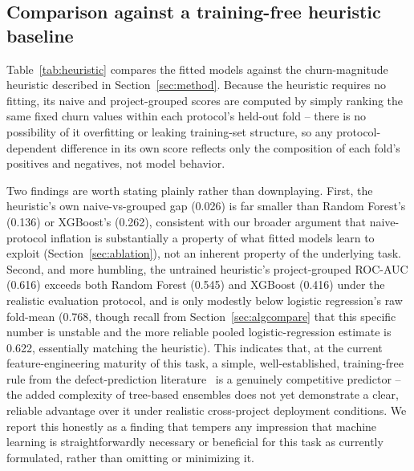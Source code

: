 \documentclass[preprint,12pt]{elsarticle}
\begin{document}
\subsection{Comparison against a training-free heuristic baseline}
\label{sec:heuristic}
Table~\ref{tab:heuristic} compares the fitted models against the churn-magnitude heuristic described in Section~\ref{sec:method}. Because the heuristic requires no fitting, its naive and project-grouped scores are computed by simply ranking the same fixed churn values within each protocol's held-out fold -- there is no possibility of it overfitting or leaking training-set structure, so any protocol-dependent difference in its own score reflects only the composition of each fold's positives and negatives, not model behavior.

\begin{table}[htbp]
\centering
\caption{Fitted models vs. the training-free churn-magnitude heuristic baseline (Section~\ref{sec:heuristic}), pooled out-of-fold ROC-AUC.}
\label{tab:heuristic}
\end{table}

Two findings are worth stating plainly rather than downplaying. First, the heuristic's own naive-vs-grouped gap (0.026) is far smaller than Random Forest's (0.136) or XGBoost's (0.262), consistent with our broader argument that naive-protocol inflation is substantially a property of what fitted models learn to exploit (Section~\ref{sec:ablation}), not an inherent property of the underlying task. Second, and more humbling, the untrained heuristic's project-grouped ROC-AUC (0.616) exceeds both Random Forest (0.545) and XGBoost (0.416) under the realistic evaluation protocol, and is only modestly below logistic regression's raw fold-mean (0.768, though recall from Section~\ref{sec:algcompare} that this specific number is unstable and the more reliable pooled logistic-regression estimate is 0.622, essentially matching the heuristic). This indicates that, at the current feature-engineering maturity of this task, a simple, well-established, training-free rule from the defect-prediction literature~\citep{nagappan2005churn} is a genuinely competitive predictor -- the added complexity of tree-based ensembles does not yet demonstrate a clear, reliable advantage over it under realistic cross-project deployment conditions. We report this honestly as a finding that tempers any impression that machine learning is straightforwardly necessary or beneficial for this task as currently formulated, rather than omitting or minimizing it.
\end{document}
